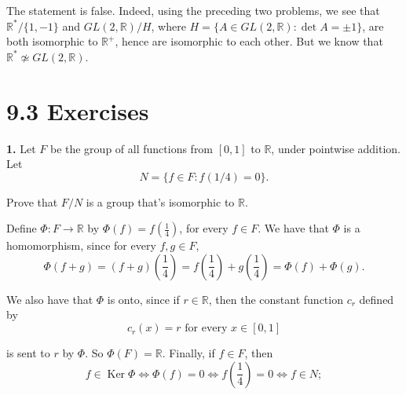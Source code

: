 \documentclass[10pt,]{book}
\theoremstyle{plain}
\theoremstyle{definition}
\theoremstyle{definition}
\theoremstyle{definition}
\theoremstyle{definition}
\numberwithin{equation}{section}
\def\R{\mathbb{R}}
\DeclareMathOperator{\Ker}{Ker}
\begin{document}
      The statement is false. Indeed, using the preceding two problems, we see that \(\R^*/\{1,-1\}\) and \(GL(2,\R)/H\),
      where \(H=\{A\in GL(2,\R):\det A =\pm 1\}\), are both isomorphic
      to \(\R^+\), hence are isomorphic to each other. But we know that
      \(\R^* \not\simeq GL(2,\R)\).
\par\smallskip
\section*{9.3 Exercises}
\noindent\textbf{1.}\quad{}
        Let \(F\) be the group of all functions from \([0,1]\) to
        \(\R\), under pointwise addition. Let
\begin{equation*}

          N=\{f\in F:
          f(1/4)=0\}.
        
\end{equation*}

\par

        Prove that \(F/N\) is a group that's
        isomorphic to \(\R\).
\par\smallskip

      Define \(\Phi:F\rightarrow \R\) by
      \(\Phi(f)=f\left(\frac{1}{4}\right)\), for every \(f\in F\). We have
      that \(\Phi\) is a homomorphism, since for every \(f, g\in F\),
\begin{equation*}

        \Phi(f+g)=(f+g)\left(\frac{1}{4}\right)=f\left(\frac{1}{4}\right)+g\left(\frac{1}{4}\right)=\Phi(f)+\Phi(g).
      
\end{equation*}

\par

      We also have that \(\Phi\) is onto, since if \(r\in \R\), then the
      constant function \(c_r\) defined by
\begin{equation*}

        c_r(x)=r \mbox{ for every \(x\in
        [0,1]\)}
      
\end{equation*}

      is sent to \(r\) by \(\Phi\). So \(\Phi(F)=\R\). Finally, if
      \(f\in F\), then
\begin{equation*}

        f\in \Ker \Phi \Leftrightarrow \Phi(f)=0 \Leftrightarrow
        f\left(\frac{1}{4}\right)=0 \Leftrightarrow f\in N;
      
\end{equation*}
\end{document}
